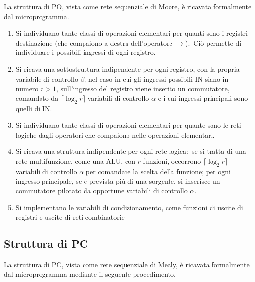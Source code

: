 La struttura di PO, vista come rete sequenziale di Moore, è ricavata formalmente dal microprogramma.

\begin{enumerate}
    \item Si individuano tante classi di operazioni elementari per quanti sono i registri destinazione (che compaiono a destra dell'operatore $\rightarrow$).\ Ciò permette di individuare i possibili ingressi di ogni registro.
    \item Si ricava una sottostruttura indipendente per ogni registro, con la propria variabile di controllo $\beta$; nel caso in cui gli ingressi possibili IN siano in numero $r>1$, sull'ingresso del registro viene inserito un commutatore, comandato da $\lceil \log_2r\rceil$ variabili di controllo $\alpha$ e i cui ingressi principali sono quelli di IN.
    \item Si individuano tante classi di operazioni elementari per quante sono le reti logiche dagli operatori che compaiono nelle operazioni elementari.
    \item Si ricava una struttura indipendente per ogni rete logica:\ se si tratta di una rete multifunzione, come una ALU, con $r$ funzioni, occorrono $\lceil \log_2r\rceil$ variabili di controllo $\alpha$ per comandare la scelta della funzione; per ogni ingresso principale, se è prevista più di una sorgente, si inserisce un commutatore pilotato da opportune variabili di controllo $\alpha$.
    \item Si implementano le variabili di condizionamento, come funzioni di uscite di registri o uscite di reti combinatorie
\end{enumerate}

\subsection{Struttura di PC}

La struttura di PC, vista come rete sequenziale di Mealy, è ricavata formalmente dal microprogramma mediante il seguente procedimento.

